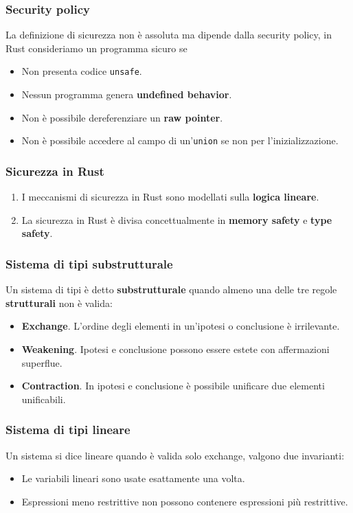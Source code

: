 \documentclass{beamer}
\newcommand{\textcode}[1]{\colorbox{backcolour}{\texttt{#1}}}
\begin{document}
\begin{frame}
    \frametitle{Security policy}
    La definizione di sicurezza non è assoluta ma dipende dalla security policy, in Rust consideriamo un programma sicuro se 
    \begin{itemize}
        \item Non presenta codice \textcode{unsafe}.
        \item Nessun programma genera \textbf{undefined behavior}.
        \item Non è possibile dereferenziare un \textbf{raw pointer}.
        \item Non è possibile accedere al campo di un'\textcode{union} se non per l'inizializzazione.
    \end{itemize}
\end{frame}

\begin{frame}
    \frametitle{Sicurezza in Rust}
    \begin{enumerate}
        \item I meccanismi di sicurezza in Rust sono modellati sulla \textbf{logica lineare}.
        \item La sicurezza in Rust è divisa concettualmente in  \textbf{memory safety} e \textbf{type safety}.
    \end{enumerate} 
\end{frame}

\begin{frame}
    \frametitle{Sistema di tipi substrutturale}
    Un sistema di tipi è detto \textbf{substrutturale} quando almeno una delle tre regole \textbf{strutturali} non è valida:
    \begin{itemize}
        \item \textbf{Exchange}. L'ordine degli elementi in un'ipotesi o conclusione è irrilevante. 
        \item \textbf{Weakening}. Ipotesi e conclusione possono essere estete con affermazioni superflue. 
        \item \textbf{Contraction}. In ipotesi e conclusione è possibile unificare due elementi unificabili. 
    \end{itemize} 
\end{frame}

\begin{frame}
    \frametitle{Sistema di tipi lineare}
    Un sistema si dice lineare quando è valida solo exchange, valgono due invarianti:
    \begin{itemize}
        \item Le variabili lineari sono usate esattamente una volta.
        \item Espressioni meno restrittive non possono contenere espressioni più restrittive.
    \end{itemize}
\end{frame}
\end{document}
